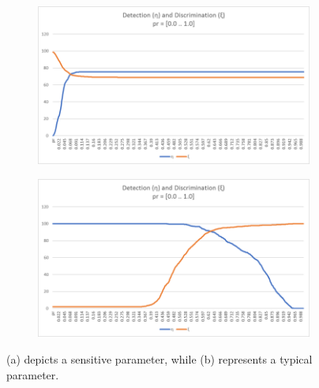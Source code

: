\begin{figure}
\centering
\begin{subfigure}{.49\linewidth}
  \includegraphics[width=1\linewidth]{figures/sensitive_param.jpg}
  \caption{}
\end{subfigure}
\hfill
\begin{subfigure}{.49\linewidth}
  \includegraphics[width=1\linewidth]{figures/campus_dd.jpg}
  \caption{}
\end{subfigure}

\caption{(a) depicts a sensitive parameter, while (b) represents a typical parameter.}
\label{fig:paramsensitivity}
\end{figure}

